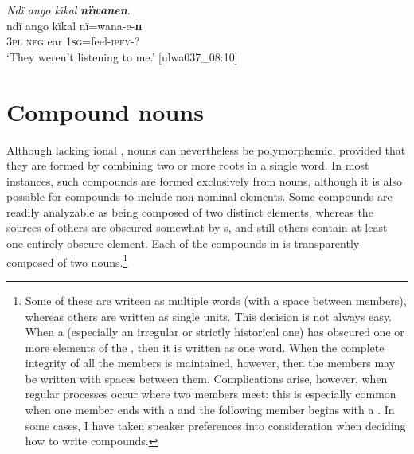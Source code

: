 \ea%
    \label{ex:nouns:42}
          \textit{Ndï ango kïkal} \textbf{\textit{nïwanen}}.\\
\gll ndï  ango  kïkal  nï=wana-e-\textbf{n}\\
    3\textsc{pl}  \textsc{neg}  ear    1\textsc{sg}=feel-\textsc{ipfv{}-?}\\
\glt `They weren’t listening to me.’ [ulwa037\_08:10]
\z


\newpage

\section{Compound nouns}\label{sec:3.3}


Although lacking ional , nouns can nevertheless be polymorphemic, provided that they are formed by combining two or more  roots in a single  word. In most instances, such compounds are formed exclusively from nouns, although it is also possible for compounds to include non-nominal elements. Some compounds are readily analyzable as being composed of two distinct  elements, whereas the sources of others are obscured somewhat by s, and still others contain at least one entirely obscure element. Each of the compounds in  is transparently composed of two nouns.\footnote{Some of these are writeen as multiple words (with a space between  members), whereas others are written as single  units. This decision is not always easy. When a  (especially an irregular or strictly historical one) has obscured one or more elements of the , then it is written as one word. When the complete  integrity of all the  members is maintained, however, then the  members may be written with spaces between them. Complications arise, however, when regular  processes occur where two  members meet: this is especially common when one member ends with a  and the following member begins with a . In some cases, I have taken speaker preferences into consideration when deciding how to write compounds.}


